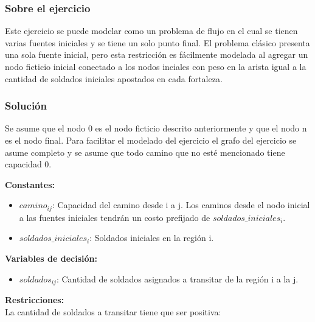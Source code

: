 \documentclass[a4paper,10pt,twocolumn]{article}
\theoremstyle{theorem}
\theoremstyle{definition}
\theoremstyle{remark}
\begin{document}
		\subsubsection{Sobre el ejercicio}\label{subsubsec:sobre_ejer_6}

Este ejercicio se puede modelar como un problema de flujo en el cual se tienen varias fuentes iniciales y se tiene un solo punto final. El problema clásico presenta una sola fuente inicial, pero esta restricción es fácilmente modelada al agregar un nodo ficticio inicial conectado a los nodos inciales con peso en la arista igual a la cantidad de soldados iniciales apostados en cada fortaleza.

		\subsubsection{Solución}\label{subsubsec:sol_ejer_6}

Se asume que el nodo 0 es el nodo ficticio descrito anteriormente y que el nodo n es el nodo final. Para facilitar el modelado del ejercicio el grafo del ejercicio se asume completo y se asume que todo camino que no esté mencionado tiene capacidad 0.

\textbf{Constantes:}

\begin{itemize}
	\item $camino_{ij}$: Capacidad del camino desde i a j. Los caminos desde el nodo inicial a las fuentes iniciales tendrán un costo prefijado de $soldados\_iniciales_i$. 
	\item $soldados\_iniciales_i$: Soldados iniciales en la región i.
\end{itemize}


\textbf{Variables de decisión:}

\begin{itemize}
	\item $soldados_{ij}$: Cantidad de soldados asignados a transitar de la región i a la j.
\end{itemize}

\textbf{Restricciones:}\\

La cantidad de soldados a transitar tiene que ser positiva:
\end{document}
